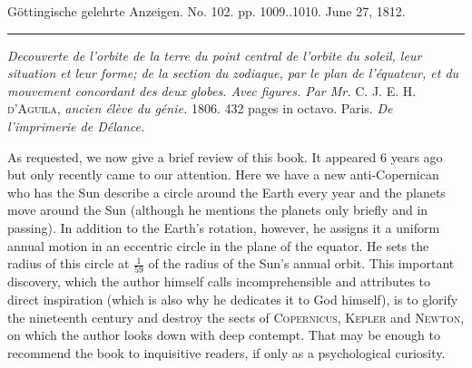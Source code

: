\clearpage
{}
\hypertarget{native-546-middle}{}\label{native-546-middle}
\begin{center}\small Göttingische gelehrte Anzeigen. No. 102. pp. 1009..1010. June 27, 1812.\\[3pt]\rule{.72\linewidth}{.3pt}\end{center}

\emph{Decouverte de l'orbite de la terre du point central de l'orbite du soleil, leur situation et leur forme; de la section du zodiaque, par le plan de l'équateur, et du mouvement concordant des deux globes. Avec figures. Par Mr.} \textsc{C. J. E. H. d'Aguila}, \emph{ancien élève du génie.} 1806. 432 pages in octavo. Paris. \emph{De l'imprimerie de Délance.}

As requested, we now give a brief review of this book. It appeared 6 years ago but only recently came to our attention. Here we have a new anti-Copernican who has the Sun describe a circle around the Earth every year and the planets move around the Sun (although he mentions the planets only briefly and in passing). In addition to the Earth's rotation, however, he assigns it a uniform annual motion in an eccentric circle in the plane of the equator. He sets the radius of this circle at $\frac{1}{59}$ of the radius of the Sun's annual orbit. This important discovery, which the author himself calls incomprehensible and attributes to direct inspiration (which is also why he dedicates it to God himself), is to glorify the nineteenth century and destroy the sects of \textsc{Copernicus}, \textsc{Kepler} and \textsc{Newton}, on which the author looks down with deep contempt. That may be enough to recommend the book to inquisitive readers, if only as a psychological curiosity.
